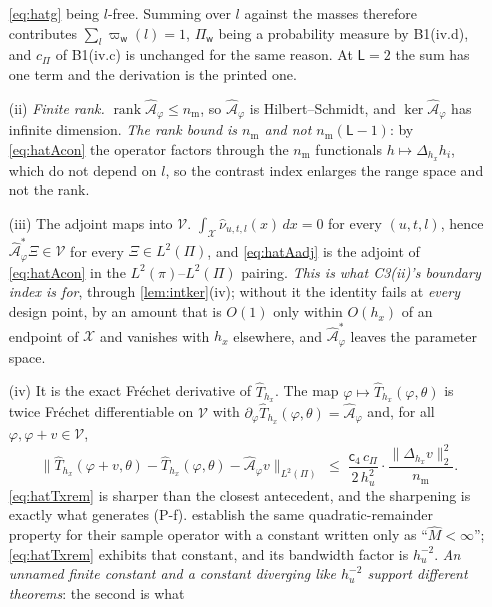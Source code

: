 \begin{proposition}
\begin{enumerate}
\eqref{eq:hatg} being $l$-free. Summing over $l$ against the masses therefore contributes
$\sum_l\varpi_{\mathsf w}(l)=1$, $\Pi_{\mathsf w}$ being a probability measure by B1(iv.d), and
$c_\Pi$ of B1(iv.c) is unchanged for the same reason. At $\mathsf L=2$ the sum has one term and
the derivation is the printed one.
\item[(ii)] \emph{Finite rank.} $\operatorname{rank}\hat{\mathcal A}_\varphi\le n_{\mathrm m}$, so
$\hat{\mathcal A}_\varphi$ is Hilbert--Schmidt, and $\ker\hat{\mathcal A}_\varphi$ has infinite
dimension. \emph{The rank bound is $n_{\mathrm m}$ and not $n_{\mathrm m}(\mathsf L-1)$}: by
\eqref{eq:hatAcon} the operator factors through the $n_{\mathrm m}$ functionals
$h\mapsto\Delta_{h_x}h_i$, which do not depend on $l$, so the contrast index enlarges the range space
and not the rank.
\item[(iii)] The adjoint maps into $\mathcal V$. $\int_{\mathcal X}\hat\nu_{u,t,l}(x)\,dx=0$ for
every $(u,t,l)$, hence $\hat{\mathcal A}^\ast_\varphi\Xi\in\mathcal V$ for every $\Xi\in L^{2}(\Pi)$,
and \eqref{eq:hatAadj} is the adjoint of \eqref{eq:hatAcon} in the $L^{2}(\pi)$--$L^{2}(\Pi)$ pairing.
\emph{This is what C3(ii)'s boundary index is for}, through \cref{lem:intker}(iv); without it the
identity fails at \emph{every} design point, by an amount that is $O(1)$ only within $O(h_x)$ of an
endpoint of $\mathcal X$ and vanishes with $h_x$ elsewhere, and
$\hat{\mathcal A}^\ast_\varphi$ leaves the parameter space.
\item[(iv)] It is the exact Fr\'echet derivative of $\hat T_{h_x}$. The map
$\varphi\mapsto\hat T_{h_x}(\varphi,\theta)$ is twice Fr\'echet differentiable on $\mathcal V$ with
$\partial_\varphi\hat T_{h_x}(\varphi,\theta)=\hat{\mathcal A}_\varphi$ and, for all
$\varphi,\varphi+v\in\mathcal V$,
\begin{equation}\label{eq:hatTxrem}
\big\|\hat T_{h_x}(\varphi+v,\theta)-\hat T_{h_x}(\varphi,\theta)-\hat{\mathcal A}_\varphi v\big\|_{L^{2}(\Pi)}
\;\le\;\frac{\mathsf c_4\,c_\Pi}{2\,h_u^{2}}\cdot\frac{\|\Delta_{h_x}v\|_2^{2}}{n_{\mathrm m}} .
\end{equation}
\eqref{eq:hatTxrem} is sharper than the closest antecedent, and the sharpening is exactly what
generates (P-f). \citet[Prop.~4.2(a)]{centorrinofeveflorens2019} establish the same quadratic-remainder
property for their sample operator with a constant written only as ``$\hat M<\infty$'';
\eqref{eq:hatTxrem} exhibits that constant, and its bandwidth factor is $h_u^{-2}$. \emph{An unnamed finite
constant and a constant diverging like $h_u^{-2}$ support different theorems}: the second is what

\end{enumerate}
\end{proposition}
